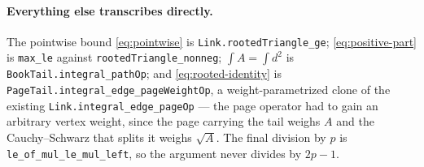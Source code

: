 \documentclass[11pt]{article}
\begin{document}
\paragraph{Everything else transcribes directly.}
The pointwise bound \eqref{eq:pointwise} is \texttt{Link.rootedTriangle\_ge};
\eqref{eq:positive-part} is \texttt{max\_le} against
\texttt{rootedTriangle\_nonneg}; $\int A=\int d^2$ is
\texttt{BookTail.integral\_pathOp}; and \eqref{eq:rooted-identity} is
\texttt{PageTail.integral\_edge\_pageWeightOp}, a weight-parametrized clone of
the existing \texttt{Link.integral\_edge\_pageOp} --- the page operator had to
gain an arbitrary vertex weight, since the page carrying the tail weighs $A$
and the Cauchy--Schwarz that splits it weighs $\sqrt A$.  The final division by
$p$ is \texttt{le\_of\_mul\_le\_mul\_left}, so the argument never divides by
$2p-1$.
\end{document}
